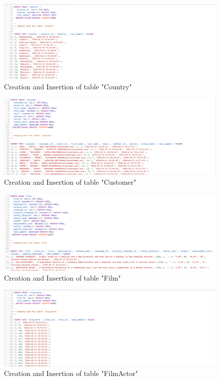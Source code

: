\documentclass{article}
\begin{document}
	\begin{figure}[H]
		\includegraphics[width=\textwidth]{table_country_cins}
		\caption{Creation and Insertion of table "Country"}	
	\end{figure}
	\begin{figure}[H]
		\includegraphics[width=\textwidth]{table_customer_cins}
		\caption{Creation and Insertion of table "Customer"}	
	\end{figure}
	\begin{figure}[H]
		\includegraphics[width=\textwidth]{table_film_cins}
		\caption{Creation and Insertion of table "Film"}	
	\end{figure}
	\begin{figure}[H]
		\includegraphics[width=\textwidth]{table_filmactor_cins}
		\caption{Creation and Insertion of table "Film\textunderscore Actor"}	
	\end{figure}
\end{document}
